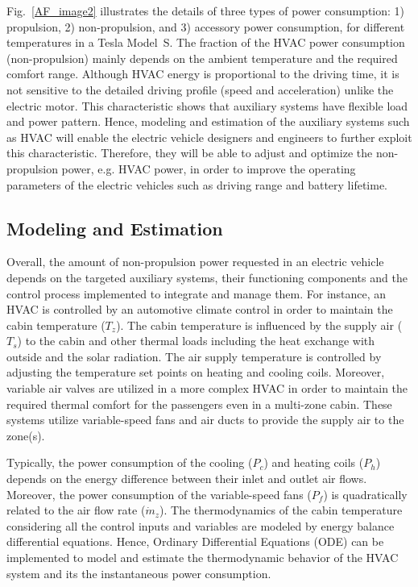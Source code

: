 Fig.~\ref{AF_image2} illustrates the details of three types of power consumption: 1) propulsion, 2) non-propulsion, and 3) accessory power consumption, for different temperatures in a Tesla Model~S. The fraction of the HVAC power consumption (non-propulsion) mainly depends on the ambient temperature and the required comfort range. Although HVAC energy is proportional to the driving time, it is not sensitive to the detailed driving profile (speed and acceleration) unlike the electric motor. This characteristic shows that auxiliary systems have flexible load and power pattern. Hence, modeling and estimation of the auxiliary systems such as HVAC will enable the electric vehicle designers and engineers to further exploit this characteristic. Therefore, they will be able to adjust and optimize the non-propulsion power, e.g. HVAC power, in order to improve the operating parameters of the electric vehicles such as driving range and battery lifetime.


\subsection{Modeling and Estimation}

Overall, the amount of non-propulsion power requested in an electric vehicle depends on the targeted auxiliary systems, their functioning components and the control process implemented to integrate and manage them.
For instance, an HVAC is controlled by an automotive climate control in order to maintain the cabin temperature ($T_z$). The cabin temperature is influenced by the supply air ($T_s$) to the cabin and other thermal loads including the heat exchange with outside and the solar radiation. The air supply temperature is controlled by adjusting the temperature set points on heating and cooling coils. Moreover, variable air valves are utilized in a more complex HVAC in order to maintain the required thermal comfort for the passengers even in a multi-zone cabin. These systems utilize variable-speed fans and air ducts to provide the supply air to the zone(s).

Typically, the power consumption of the cooling ($P_c$) and heating coils ($P_h$) depends on the energy difference between their inlet and outlet air flows. Moreover, the power consumption of the variable-speed fans ($P_f$) is quadratically related to the air flow rate ($\dot{m}_z$). The thermodynamics of the cabin temperature considering all the control inputs and variables are modeled by energy balance differential equations. Hence, Ordinary Differential Equations (ODE) can be implemented to model and estimate the thermodynamic behavior of the HVAC system and its the instantaneous power consumption. 

